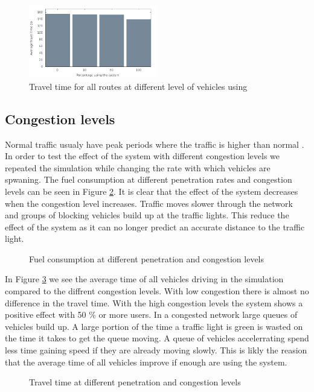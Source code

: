 \begin{figure}[h]
\includegraphics[width=0.5\textwidth]{../images/tp0c1_0/combinedTime.png}
\caption{Travel time for all routes at different level of vehicles using \tech}
\label{fig:TestResults:combinedTime}
\end{figure}

\subsection{Congestion levels}
Normal traffic usualy have peak periods where the traffic is higher than normal \cite{Vejdir}. 
In order to test the effect of the system with different congestion levels we repeated the simulation while changing the rate with which vehicles are spwaning. 
The fuel consumption at different penetration rates and congestion levels can be seen in Figure \ref{fig:TestResults:congestionFuel}. 
It is clear that the effect of the system decreases when the congestion level increases. 
Traffic moves slower through the network and groups of blocking vehicles build up at the traffic lights. 
This reduce the effect of the system as it can no longer predict an accurate distance to the traffic light.
\begin{figure}[h]
\caption{Fuel consumption at different penetration and congestion levels}
\label{fig:TestResults:congestionFuel}
\end{figure}

In Figure \ref{fig:TestResults:congestionTime} we see the average time of all vehicles driving in the simulation compared to the diffrent congestion levels. 
With low congestion there is almost no difference in the travel time.
With the high congestion levels the system shows a positive effect with 50 \% or more users. 
In a congested network large queues of vehicles build up. 
A large portion of the time a traffic light is green is wasted on the time it takes to get the queue moving. 
A queue of vehicles accelerrating spend less time gaining speed if they are already moving slowly. 
This is likly the reasion that the average time of all vehicles improve if enough are using the system.
\begin{figure}[h]
\caption{Travel time at different penetration and congestion levels}
\label{fig:TestResults:congestionTime}
\end{figure}



